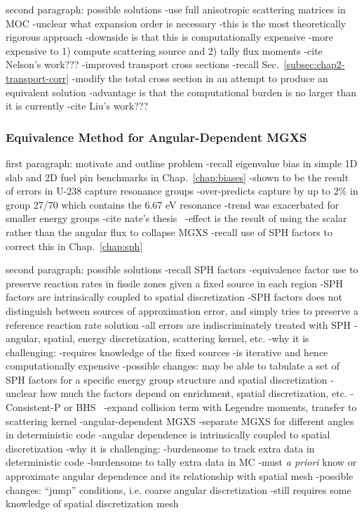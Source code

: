 second paragraph: possible solutions
-use full anisotropic scattering matrices in MOC
  -unclear what expansion order is necessary
  -this is the most theoretically rigorous approach
  -downside is that this is computationally expensive
    -more expensive to 1) compute scattering source and 2) tally flux moments
  -cite Nelson's work???
-improved transport cross sections
  -recall Sec.~\ref{subsec:chap2-transport-corr}
  -modify the total cross section in an attempt to produce an equivalent solution 
  -advantage is that the computational burden is no larger than it is currently
  -cite Liu's work???

\subsubsection{Equivalence Method for Angular-Dependent MGXS}
\label{subsubsec:chap12-angular-dependent-mgxs}

first paragraph: motivate and outline problem
-recall eigenvalue bias in simple 1D slab and 2D fuel pin benchmarks in Chap.~\ref{chap:biases}
-shown to be the result of errors in U-238 capture resonance groups
  -over-predicts capture by up to 2\% in group 27/70 which contains the 6.67 eV resonance 
  -trend was exacerbated for smaller energy groups
-cite nate's thesis~\cite{gibson2016thesis}
  -effect is the result of using the scalar rather than the angular flux to collapse \ac{MGXS}
-recall use of \ac{SPH} factors to correct this in Chap.~\ref{chap:sph}

second paragraph: possible solutions
-recall \ac{SPH} factors
  -equivalence factor use to preserve reaction rates in fissile zones given a fixed source in each region
  -\ac{SPH} factors are intrinsically coupled to spatial discretization
  -\ac{SPH} factors does not distinguish between sources of approximation error, and simply tries to preserve a reference reaction rate solution
    -all errors are indiscriminately treated with \ac{SPH}
      -angular, spatial, energy discretization, scattering kernel, etc. 
  -why it is challenging: 
    -requires knowledge of the fixed sources
    -is iterative and hence computationally expensive
  -possible changes: may be able to tabulate a set of \ac{SPH} factors for a specific energy group structure and spatial discretization
  -unclear how much the factors depend on enrichment, spatial discretization, etc.
-Consistent-P or BHS~\cite{bell1967transport}
  -expand collision term with Legendre moments, transfer to scattering kernel
-angular-dependent \ac{MGXS}
  -separate \ac{MGXS} for different angles in deterministic code
  -angular dependence is intrinsically coupled to spatial discretization
  -why it is challenging:
    -burdensome to track extra data in deterministic code
    -burdensome to tally extra data in \ac{MC}
    -must \textit{a priori} know or approximate angular dependence and its relationship with spatial mesh
  -possible changes: ``jump'' conditions, i.e. coarse angular discretization
    -still requires some knowledge of spatial discretization mesh

